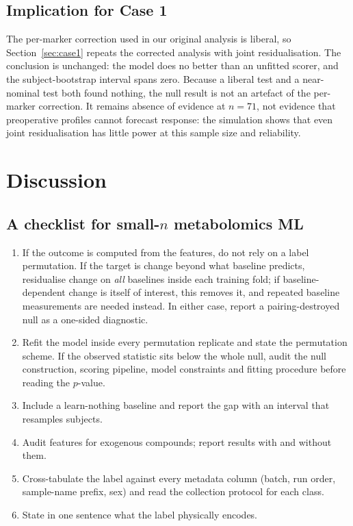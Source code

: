 \documentclass[conference]{IEEEtran}
\begin{document}
\subsection{Implication for Case 1}
The per-marker correction used in our original analysis is liberal, so
Section~\ref{sec:case1} repeats the corrected analysis with joint
residualisation. The conclusion is unchanged: the model does no better than
an unfitted scorer, and the subject-bootstrap interval spans zero. Because a
liberal test and a near-nominal test both found nothing, the null result is
not an artefact of the per-marker correction. It remains absence of evidence
at $n=71$, not evidence that preoperative profiles cannot forecast response:
the simulation shows that even joint residualisation has little power at this
sample size and reliability.

\section{Discussion}
\label{sec:discussion}

\subsection{A checklist for small-$n$ metabolomics ML}
\begin{enumerate}
  \item If the outcome is computed from the features, do not rely on a
        label permutation. If the target is change beyond what baseline
        predicts, residualise change on \emph{all} baselines inside each
        training fold; if baseline-dependent change is itself of interest,
        this removes it, and repeated baseline measurements are needed
        instead. In either case, report a pairing-destroyed null as a
        one-sided diagnostic.
  \item Refit the model inside every permutation replicate and state the
        permutation scheme. If the observed statistic sits below the whole
        null, audit the null construction, scoring pipeline, model
        constraints and fitting procedure before reading the $p$-value.
  \item Include a learn-nothing baseline and report the gap with an interval
        that resamples subjects.
  \item Audit features for exogenous compounds; report results with and
        without them.
  \item Cross-tabulate the label against every metadata column (batch, run
        order, sample-name prefix, sex) and read the collection protocol for
        each class.
  \item State in one sentence what the label physically encodes.
\end{enumerate}
\end{document}
